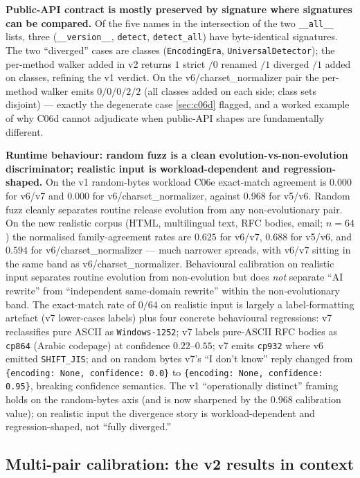 \documentclass[11pt,letterpaper]{article}
\begin{document}
\textbf{Public-API contract is mostly preserved by signature
where signatures can be compared.} Of the five names in the
intersection of the two \texttt{\_\_all\_\_} lists, three
(\texttt{\_\_version\_\_}, \texttt{detect}, \texttt{detect\_all})
have byte-identical signatures. The two ``diverged'' cases are
classes (\texttt{EncodingEra}, \texttt{UniversalDetector}); the
per-method walker added in v2 returns $1$ strict $/ 0$ renamed
$/ 1$ diverged $/ 1$ added on classes, refining the v1 verdict.
On the v6/charset\_normalizer pair the per-method walker emits
$0/0/0/2/2$ (all classes added on each side; class sets disjoint)
--- exactly the degenerate case \cref{sec:c06d} flagged, and a
worked example of why C06d cannot adjudicate when public-API
shapes are fundamentally different.

\textbf{Runtime behaviour: random fuzz is a clean
evolution-vs-non-evolution discriminator; realistic input is
workload-dependent and regression-shaped.} On the v1 random-bytes
workload C06e exact-match agreement is $0.000$ for v6/v7 and
$0.000$ for v6/charset\_normalizer, against $0.968$ for v5/v6.
Random fuzz cleanly separates routine release evolution from any
non-evolutionary pair. On the new realistic corpus (HTML,
multilingual text, RFC bodies, email; $n=64$) the normalised
family-agreement rates are $0.625$ for v6/v7, $0.688$ for v5/v6,
and $0.594$ for v6/charset\_normalizer --- much narrower
spreads, with v6/v7 sitting in the same band as
v6/charset\_normalizer. Behavioural calibration on realistic input
separates routine evolution from non-evolution but does \emph{not}
separate ``AI rewrite'' from ``independent same-domain rewrite''
within the non-evolutionary band. The exact-match rate of $0/64$
on realistic input is largely a label-formatting artefact (v7
lower-cases labels) plus four concrete behavioural regressions:
v7 reclassifies pure ASCII as \texttt{Windows-1252}; v7 labels
pure-ASCII RFC bodies as \texttt{cp864} (Arabic codepage) at
confidence $0.22$--$0.55$; v7 emits \texttt{cp932} where v6
emitted \texttt{SHIFT\_JIS}; and on random bytes v7's
``I don't know'' reply changed from
\texttt{\{encoding: None, confidence: 0.0\}} to
\texttt{\{encoding: None, confidence: 0.95\}}, breaking
confidence semantics. The v1 ``operationally distinct'' framing
holds on the random-bytes axis (and is now sharpened by the
$0.968$ calibration value); on realistic input the divergence
story is workload-dependent and regression-shaped, not
``fully diverged.''

\subsection{Multi-pair calibration: the v2 results in context}
\label{sec:results-calibration}
\end{document}
